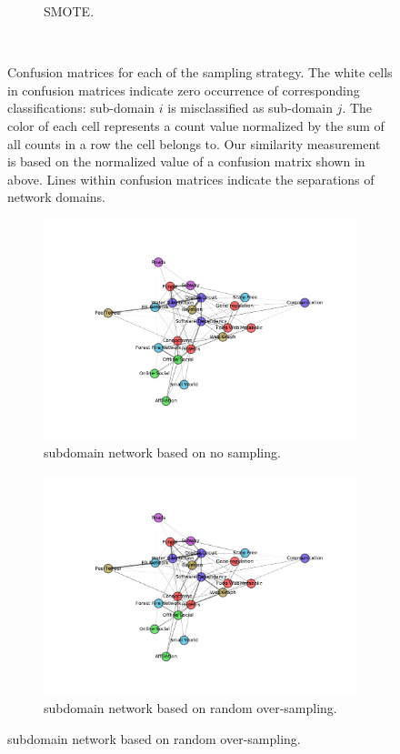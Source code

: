 \documentclass{article}
\begin{document}
\begin{figure}[H]
\begin{subfigure}{0.48\textwidth}
	\caption{SMOTE. } \label{smote_confusion_sub}
	\end{subfigure}
\
\caption{Confusion matrices for each of the sampling strategy. The white cells in confusion matrices indicate zero occurrence of corresponding classifications: sub-domain $i$ is misclassified as sub-domain $j$. The color of each cell represents a count value normalized by the sum of all counts in a row the cell belongs to. Our similarity measurement is based on the normalized value of a confusion matrix shown in above. Lines within confusion matrices indicate the separations of network domains.} \label{confusion_sub}
\end{figure}

\begin{figure}[H]
	\begin{subfigure}{0.48\textwidth}
	\includegraphics[width=\linewidth]{figs/similarity/SubDomain/None/g.png}
	\caption{subdomain network based on no sampling.} \label{no_graph_sub_original}
	\end{subfigure}\hspace*{\fill}
	\begin{subfigure}{0.48\textwidth}
	\includegraphics[width=\linewidth]{figs/similarity/SubDomain/RandomOver/g.png}
	\caption{subdomain network based on random over-sampling.} \label{random_over_graph_sub_original}
	\end{subfigure}
	

\end{figure}
\end{document}
